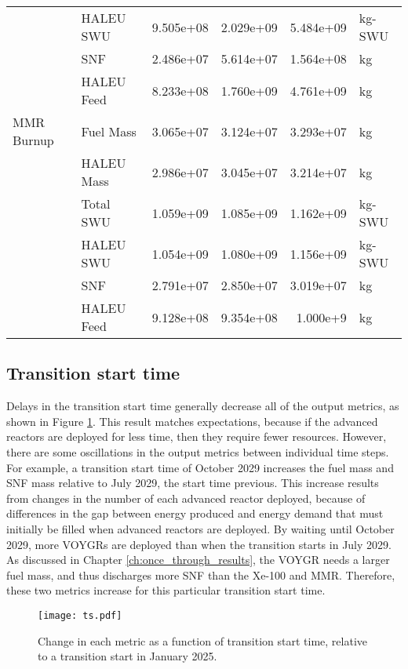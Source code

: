 \begin{table}[ht!]
\begin{tabular}{llrrrl}
                      &  HALEU SWU & 9.505e+08 & 2.029e+09 & 5.484e+09 & kg-SWU\\
                      &        SNF & 2.486e+07 & 5.614e+07 & 1.564e+08 & kg\\
                      & HALEU Feed & 8.233e+08 & 1.760e+09 & 4.761e+09 & kg\\\hline 
        MMR Burnup &  Fuel Mass & 3.065e+07 & 3.124e+07 & 3.293e+07 & kg\\
                   & HALEU Mass & 2.986e+07 & 3.045e+07 & 3.214e+07 & kg\\
                   &  Total SWU & 1.059e+09 & 1.085e+09 & 1.162e+09 & kg-SWU\\
                   &  HALEU SWU & 1.054e+09 & 1.080e+09 & 1.156e+09 & kg-SWU\\
                   &        SNF & 2.791e+07 & 2.850e+07 & 3.019e+07 & kg\\
                   & HALEU Feed & 9.128e+08 & 9.354e+08 & 1.000e+9 & kg\\
        \hline
    \end{tabular}
\end{table}


\subsection{Transition start time}
Delays in the transition start time generally decrease all of the output 
metrics, as shown in Figure \ref{fig:ts_scenario7}. This result matches 
expectations, because if the advanced reactors are deployed for less time, 
then they require fewer resources. However, there are some oscillations in 
the output metrics between individual time steps. For example, a transition 
start time of October 2029 increases the fuel mass and \gls{SNF} mass 
relative to July 2029, the start time previous. This increase results 
from changes in the number 
of each advanced reactor deployed, because of differences in the gap 
between energy produced and energy demand that must initially be filled when 
advanced reactors are deployed. By waiting until October 2029, more VOYGRs 
are deployed than when the transition starts in July 2029. As discussed in 
Chapter \ref{ch:once_through_results}, the VOYGR needs a larger fuel mass, 
and thus discharges more \gls{SNF} than the Xe-100 and \gls{MMR}. Therefore, 
these two metrics increase for this particular transition start time. 

\begin{figure}[h!]
    \centering
    \texttt{[image: ts.pdf]}
    \caption{Change in each metric as a function of transition start 
    time, relative to a transition start in January 2025.}
    \label{fig:ts_scenario7}
\end{figure}

